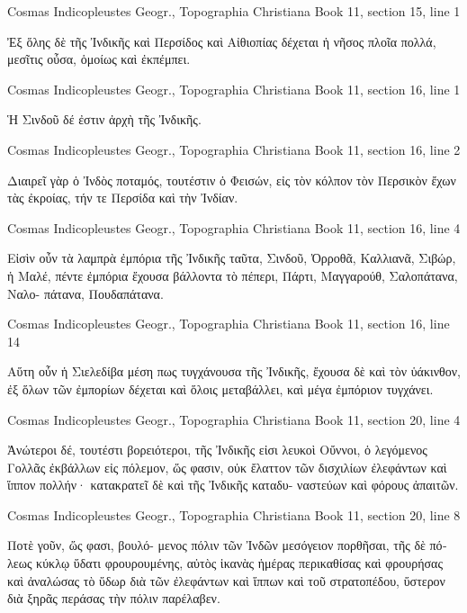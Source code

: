 \documentclass[12pt,letterpaper,twoside,final]{memoir}
\begin{document}
\begin{greek}
Cosmas Indicopleustes Geogr., Topographia Christiana 
Book 11, section 15, line 1

Ἐξ ὅλης δὲ τῆς Ἰνδικῆς καὶ Περσίδος καὶ Αἰθιοπίας 
δέχεται ἡ νῆσος πλοῖα πολλά, μεσῖτις οὖσα, ὁμοίως καὶ 
ἐκπέμπει. 



Cosmas Indicopleustes Geogr., Topographia Christiana 
Book 11, section 16, line 1

Ἡ Σινδοῦ δέ ἐστιν ἀρχὴ τῆς Ἰνδικῆς. 



Cosmas Indicopleustes Geogr., Topographia Christiana 
Book 11, section 16, line 2

                                                 Διαιρεῖ γὰρ 
ὁ Ἰνδὸς ποταμός, τουτέστιν ὁ Φεισών, εἰς τὸν κόλπον τὸν 
Περσικὸν ἔχων τὰς ἐκροίας, τήν τε Περσίδα καὶ τὴν Ἰνδίαν. 



Cosmas Indicopleustes Geogr., Topographia Christiana 
Book 11, section 16, line 4

Εἰσὶν οὖν τὰ λαμπρὰ ἐμπόρια τῆς Ἰνδικῆς ταῦτα, Σινδοῦ, 
Ὀρροθᾶ, Καλλιανᾶ, Σιβώρ, ἡ Μαλέ, πέντε ἐμπόρια ἔχουσα 
βάλλοντα τὸ πέπερι, Πάρτι, Μαγγαρούθ, Σαλοπάτανα, Ναλο-
πάτανα, Πουδαπάτανα. 



Cosmas Indicopleustes Geogr., Topographia Christiana 
Book 11, section 16, line 14

      Αὕτη οὖν ἡ Σιελεδίβα μέση πως τυγχάνουσα τῆς Ἰνδικῆς, 
ἔχουσα δὲ καὶ τὸν ὑάκινθον, ἐξ ὅλων τῶν ἐμπορίων δέχεται καὶ 
ὅλοις μεταβάλλει, καὶ μέγα ἐμπόριον τυγχάνει. 



Cosmas Indicopleustes Geogr., Topographia Christiana 
Book 11, section 20, line 4

                   Ἀνώτεροι δέ, τουτέστι βορειότεροι, τῆς 
Ἰνδικῆς εἰσι λευκοὶ Οὔννοι, ὁ λεγόμενος Γολλᾶς ἐκβάλλων εἰς 
πόλεμον, ὥς φασιν, οὐκ ἔλαττον τῶν δισχιλίων ἐλεφάντων καὶ 
ἵππον πολλήν· κατακρατεῖ δὲ καὶ τῆς Ἰνδικῆς καταδυ-
ναστεύων καὶ φόρους ἀπαιτῶν. 



Cosmas Indicopleustes Geogr., Topographia Christiana 
Book 11, section 20, line 8

                                  Ποτὲ γοῦν, ὥς φασι, βουλό-
μενος πόλιν τῶν Ἰνδῶν μεσόγειον πορθῆσαι, τῆς δὲ πόλεως 
κύκλῳ ὕδατι φρουρουμένης, αὐτὸς ἱκανὰς ἡμέρας περικαθίσας   
καὶ φρουρήσας καὶ ἀναλώσας τὸ ὕδωρ διὰ τῶν ἐλεφάντων καὶ 
ἵππων καὶ τοῦ στρατοπέδου, ὕστερον διὰ ξηρᾶς περάσας τὴν 
πόλιν παρέλαβεν. 




\end{greek}
\end{document}
